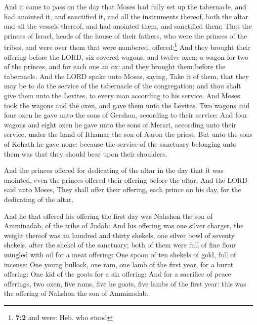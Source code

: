  And it came to pass on the day that Moses had fully set
up the tabernacle, and had anointed it, and sanctified it, and all the
instruments thereof, both the altar and all the vessels thereof, and had
anointed them, and sanctified them;  That the princes of
Israel, heads of the house of their fathers, who were the princes of the
tribes, and were over them that were numbered, offered:\footnote{\textbf{7:2}
  and were: Heb. who stood}  And they brought their
offering before the LORD, six covered wagons, and twelve oxen; a wagon
for two of the princes, and for each one an ox: and they brought them
before the tabernacle.  And the LORD spake unto Moses,
saying,  Take it of them, that they may be to do the
service of the tabernacle of the congregation; and thou shalt give them
unto the Levites, to every man according to his service. 
And Moses took the wagons and the oxen, and gave them unto the Levites.
 Two wagons and four oxen he gave unto the sons of
Gershon, according to their service:  And four wagons and
eight oxen he gave unto the sons of Merari, according unto their
service, under the hand of Ithamar the son of Aaron the priest.
 But unto the sons of Kohath he gave none: because the
service of the sanctuary belonging unto them was that they should bear
upon their shoulders.

 And the princes offered for dedicating of the altar in
the day that it was anointed, even the princes offered their offering
before the altar.  And the LORD said unto Moses, They
shall offer their offering, each prince on his day, for the dedicating
of the altar.

 And he that offered his offering the first day was
Nahshon the son of Amminadab, of the tribe of Judah:  And
his offering was one silver charger, the weight thereof was an hundred
and thirty shekels, one silver bowl of seventy shekels, after the shekel
of the sanctuary; both of them were full of fine flour mingled with oil
for a meat offering:  One spoon of ten shekels of gold,
full of incense:  One young bullock, one ram, one lamb of
the first year, for a burnt offering:  One kid of the
goats for a sin offering:  And for a sacrifice of peace
offerings, two oxen, five rams, five he goats, five lambs of the first
year: this was the offering of Nahshon the son of Amminadab.

